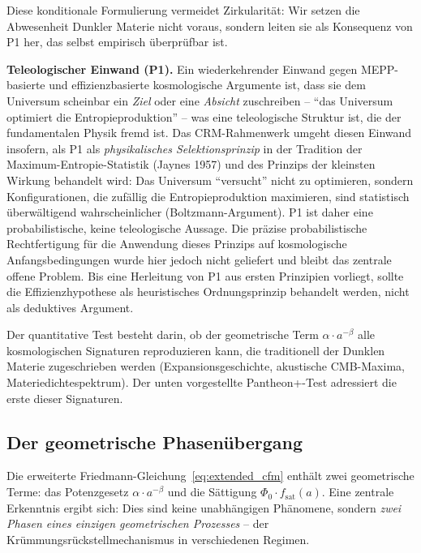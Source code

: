 \documentclass[aps,prd,twocolumn,superscriptaddress,nofootinbib,floatfix]{revtex4-2}
\begin{document}
Diese konditionale Formulierung vermeidet Zirkularität: Wir setzen die Abwesenheit Dunkler Materie nicht voraus, sondern leiten sie als Konsequenz von P1 her, das selbst empirisch überprüfbar ist.

\textbf{Teleologischer Einwand (P1).} Ein wiederkehrender Einwand gegen MEPP-basierte und effizienzbasierte kosmologische Argumente ist, dass sie dem Universum scheinbar ein \textit{Ziel} oder eine \textit{Absicht} zuschreiben -- "`das Universum optimiert die Entropieproduktion"' -- was eine teleologische Struktur ist, die der fundamentalen Physik fremd ist. Das CRM-Rahmenwerk umgeht diesen Einwand insofern, als P1 als \textit{physikalisches Selektionsprinzip} in der Tradition der Maximum-Entropie-Statistik (Jaynes 1957) und des Prinzips der kleinsten Wirkung behandelt wird: Das Universum "`versucht"' nicht zu optimieren, sondern Konfigurationen, die zufällig die Entropieproduktion maximieren, sind statistisch überwältigend wahrscheinlicher (Boltzmann-Argument). P1 ist daher eine probabilistische, keine teleologische Aussage. Die präzise probabilistische Rechtfertigung für die Anwendung dieses Prinzips auf kosmologische Anfangsbedingungen wurde hier jedoch nicht geliefert und bleibt das zentrale offene Problem. Bis eine Herleitung von P1 aus ersten Prinzipien vorliegt, sollte die Effizienzhypothese als heuristisches Ordnungsprinzip behandelt werden, nicht als deduktives Argument.

Der quantitative Test besteht darin, ob der geometrische Term $\alpha \cdot a^{-\beta}$ alle kosmologischen Signaturen reproduzieren kann, die traditionell der Dunklen Materie zugeschrieben werden (Expansionsgeschichte, akustische CMB-Maxima, Materiedichtespektrum). Der unten vorgestellte Pantheon+-Test adressiert die erste dieser Signaturen.

\subsection{Der geometrische Phasenübergang}
\label{subsec:phase_transition}

Die erweiterte Friedmann-Gleichung~\eqref{eq:extended_cfm} enthält zwei geometrische Terme: das Potenzgesetz $\alpha \cdot a^{-\beta}$ und die Sättigung $\Phi_0 \cdot f_{\mathrm{sat}}(a)$. Eine zentrale Erkenntnis ergibt sich: Dies sind keine unabhängigen Phänomene, sondern \textit{zwei Phasen eines einzigen geometrischen Prozesses} -- der Krümmungsrückstellmechanismus in verschiedenen Regimen.
\end{document}
